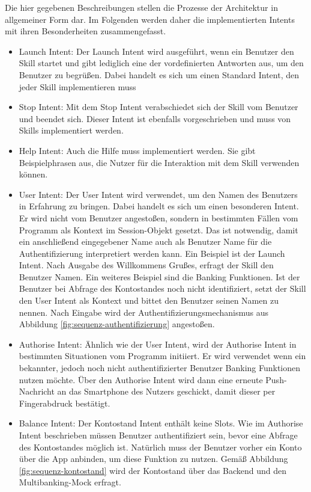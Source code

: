Die hier gegebenen Beschreibungen stellen die Prozesse der Architektur in allgemeiner Form dar. Im Folgenden werden daher die implementierten Intents mit ihren Besonderheiten zusammengefasst. 

\begin{itemize}
    \item Launch Intent: Der Launch Intent wird ausgeführt, wenn ein Benutzer den Skill startet und gibt lediglich eine der vordefinierten Antworten aus, um den Benutzer zu begrüßen. Dabei handelt es sich um einen Standard Intent, den jeder Skill implementieren muss
    
    \item Stop Intent: Mit dem Stop Intent verabschiedet sich der Skill vom Benutzer und beendet sich. Dieser Intent ist ebenfalls vorgeschrieben und muss von Skills implementiert werden.
    
    \item Help Intent: Auch die Hilfe muss implementiert werden. Sie gibt Beispielphrasen aus, die Nutzer für die Interaktion mit dem Skill verwenden können.
    
    \item User Intent: Der User Intent wird verwendet, um den Namen des Benutzers in Erfahrung zu bringen. Dabei handelt es sich um einen besonderen Intent. Er wird nicht vom Benutzer angestoßen, sondern in bestimmten Fällen vom Programm als Kontext im Session-Objekt gesetzt. Das ist notwendig, damit ein anschließend eingegebener Name auch als Benutzer Name für die Authentifizierung interpretiert werden kann. Ein Beispiel ist der Launch Intent. Nach Ausgabe des Willkommens Grußes, erfragt der Skill den Benutzer Namen. Ein weiteres Beispiel sind die Banking Funktionen. Ist der Benutzer bei Abfrage des Kontostandes noch nicht identifiziert, setzt der Skill den User Intent als Kontext und bittet den Benutzer  seinen Namen zu nennen. Nach Eingabe wird der Authentifizierungsmechanismus aus Abbildung \ref{fig:sequenz-authentifizierung} angestoßen.
    
    \item Authorise Intent: Ähnlich wie der User Intent, wird der Authorise Intent in bestimmten Situationen vom Programm initiiert. Er wird verwendet wenn ein bekannter, jedoch noch nicht authentifizierter Benutzer Banking Funktionen nutzen möchte. Über den Authorise Intent wird dann eine erneute Push-Nachricht an das Smartphone des Nutzers geschickt, damit dieser per Fingerabdruck bestätigt. 
    
    \item Balance Intent: Der Kontostand Intent enthält keine Slots. Wie im Authorise Intent beschrieben müssen Benutzer authentifiziert sein, bevor eine Abfrage des Kontostandes möglich ist. Natürlich muss der Benutzer vorher ein Konto über die App anbinden, um diese Funktion zu nutzen. Gemäß Abbildung \ref{fig:sequenz-kontostand} wird der Kontostand über das Backend und den Multibanking-Mock erfragt. 
    

\end{itemize}
